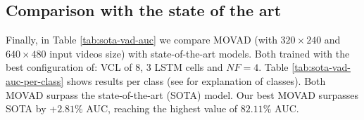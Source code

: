 \subsection{Comparison with the state of the art}
Finally, in Table \ref{tab:sota-vad-auc} we compare MOVAD (with $320\times240$ and $640\times480$ input videos size) with state-of-the-art models.
Both trained with the best configuration of: VCL of 8, 3 LSTM cells and $\mathit{NF}=4$.
Table \ref{tab:sota-vad-auc-per-class} shows results per class (see \cite{9712446} for explanation of classes).
Both MOVAD surpass the state-of-the-art (SOTA) model.
Our best MOVAD surpasses SOTA by +$2.81\%$ AUC, reaching the highest value of $82.11\%$ AUC.
